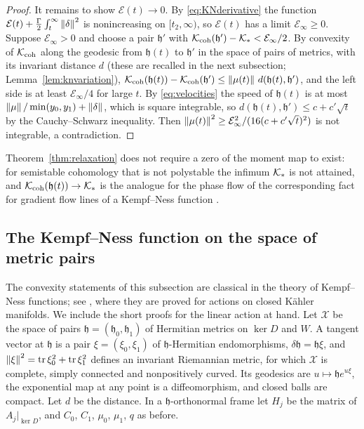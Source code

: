 \begin{proof}
It remains to show $\mathcal E(t)\to0$. By \eqref{eq:KNderivative} the
function $\mathcal E(t)+\frac\Gamma2\int_t^\infty\left\lVert\delta\right\rVert^2$ is
nonincreasing on $[t_2,\infty)$, so $\mathcal E(t)$ has a limit
$\mathcal E_\infty\geq0$. Suppose $\mathcal E_\infty>0$ and choose a pair
$\mathfrak h'$ with $\mathcal K_{\mathrm{coh}}(\mathfrak h')-\mathcal K_*<\mathcal E_\infty/2$. By convexity of
$\mathcal K_{\mathrm{coh}}$ along the geodesic from $\mathfrak h(t)$ to $\mathfrak h'$ in the
space of pairs of metrics, with its invariant distance $d$ (these are
recalled in the next subsection; Lemma~\ref{lem:knvariation}),
$\mathcal K_{\mathrm{coh}}(\mathfrak h(t))-\mathcal K_{\mathrm{coh}}(\mathfrak h')\leq\left\lVert\mu(t)\right\rVert\,d(\mathfrak h(t),\mathfrak h')$, and the left
side is at least $\mathcal E_\infty/4$ for large $t$. By
\eqref{eq:velocities} the speed of $\mathfrak h(t)$ is at most
$\left\lVert\mu\right\rVert/\min(y_0,y_1)+\left\lVert\delta\right\rVert$, which is square integrable, so
$d(\mathfrak h(t),\mathfrak h')\leq c+c'\sqrt t$ by the Cauchy--Schwarz inequality. Then
$\left\lVert\mu(t)\right\rVert^2\geq\mathcal E_\infty^2/(16(c+c'\sqrt t)^2)$ is not
integrable, a contradiction.
\end{proof}

Theorem~\ref{thm:relaxation} does not require a zero of the moment map to
exist: for semistable cohomology that is not polystable the infimum $\mathcal K_*$
is not attained, and $\mathcal K_{\mathrm{coh}}(\mathfrak h(t))\to\mathcal K_*$ is the analogue for the phase
flow of the corresponding fact for gradient flow lines of a Kempf--Ness
function \cite[Theorem~4.3]{grs21}.

\subsection{The Kempf--Ness function on the space of metric pairs}
The convexity statements of this subsection are classical in the theory of
Kempf--Ness functions; see \cite[Theorem~4.3]{grs21}, where they are proved
for actions on closed K\"ahler manifolds. We include the short proofs for the
linear action at hand. Let $\mathcal X$ be the space of pairs $\mathfrak h=(\mathfrak h_0,\mathfrak h_1)$
of Hermitian metrics on $\ker D$ and $W$. A tangent vector at $\mathfrak h$ is a pair
$\xi=(\xi_0,\xi_1)$ of $\mathfrak h$-Hermitian endomorphisms, $\delta\mathfrak h=\mathfrak h\xi$, and
$\left\lVert\xi\right\rVert^2=\operatorname{tr}\xi_0^2+\operatorname{tr}\xi_1^2$ defines an invariant Riemannian metric, for
which $\mathcal X$ is complete, simply connected and nonpositively curved.
Its geodesics are $u\mapsto \mathfrak he^{u\xi}$, the exponential map at any point is a
diffeomorphism, and closed balls are compact. Let $d$ be the distance. In a
$\mathfrak h$-orthonormal frame let $H_j$ be the matrix of $A_j|_{\ker D}$, and $C_0$,
$C_1$, $\mu_0$, $\mu_1$, $q$ as before.


